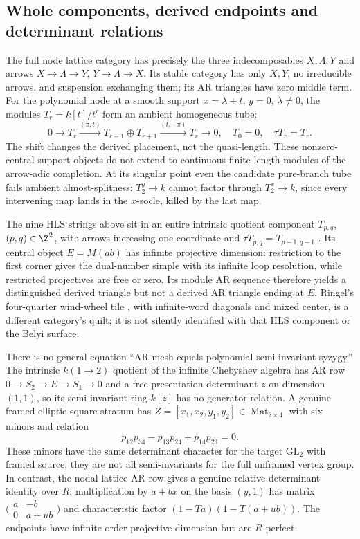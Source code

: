 \documentclass[11pt]{article}
\theoremstyle{definition}\newtheorem{definition}[theorem]{Definition}
\theoremstyle{remark}\newtheorem{remark}[theorem]{Remark}
\begin{document}
\subsection{Whole components, derived endpoints and determinant relations}
The full node lattice category has precisely the three indecomposables $X,\Lambda,Y$ and arrows $X\to\Lambda\to Y$, $Y\to\Lambda\to X$. Its stable category has only $X,Y$, no irreducible arrows, and suspension exchanging them; its AR triangles have zero middle term. For the polynomial node at a smooth support $x=\lambda+t$, $y=0$, $\lambda\ne0$, the modules $T_r=k[t]/t^r$ form an ambient homogeneous tube:
\[
 0\longrightarrow T_r\xrightarrow{(\pi,t)}T_{r-1}\oplus T_{r+1}
 \xrightarrow{(t,-\pi)}T_r\longrightarrow0,\quad T_0=0,\quad\tau T_r=T_r.
\]
The shift changes the derived placement, not the quasi-length. These nonzero-central-support objects do not extend to continuous finite-length modules of the arrow-adic completion. At its singular point even the candidate pure-branch tube fails ambient almost-splitness: $T_2^y\to k$ cannot factor through $T_2^x\to k$, since every intervening map lands in the $x$-socle, killed by the last map.

The nine HLS strings above sit in an entire intrinsic quotient component $T_{p,q}$, $(p,q)\in\Z^2$, with arrows increasing one coordinate and $\tau T_{p,q}=T_{p-1,q-1}$ \cite{HuangLinSu}. Its central object $E=M(ab)$ has infinite projective dimension: restriction to the first corner gives the dual-number simple with its infinite loop resolution, while restricted projectives are free or zero. Its module AR sequence therefore yields a distinguished derived triangle but not a derived AR triangle ending at $E$. Ringel's four-quarter wind-wheel tile \cite{Ringel}, with infinite-word diagonals and mixed center, is a different category's quilt; it is not silently identified with that HLS component or the Belyi surface.

There is no general equation ``AR mesh equals polynomial semi-invariant syzygy.'' The intrinsic $k(1\to2)$ quotient of the infinite Chebyshev algebra has AR row $0\to S_2\to E\to S_1\to0$ and a free presentation determinant $z$ on dimension $(1,1)$, so its semi-invariant ring $k[z]$ has no generator relation. A genuine framed elliptic-square stratum has $Z=[x_1,x_2,y_1,y_2]\in\operatorname{Mat}_{2\times4}$ with six minors and relation
\[
 p_{12}p_{34}-p_{13}p_{24}+p_{14}p_{23}=0.
\]
These minors have the same determinant character for the target $\mathrm{GL}_2$ with framed source; they are not all semi-invariants for the full unframed vertex group. In contrast, the nodal lattice AR row gives a genuine relative determinant identity over $R$: multiplication by $a+bx$ on the basis $(y,1)$ has matrix
$\bigl(\begin{smallmatrix}a&-b\\0&a+ub\end{smallmatrix}\bigr)$ and characteristic factor $(1-Ta)(1-T(a+ub))$. The endpoints have infinite order-projective dimension but are $R$-perfect.
\end{document}
